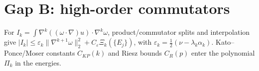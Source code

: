 \section{Gap B: high-order commutators}\label{app:gapB}
For $I_k=\int \nabla^k((\omega\cdot\nabla)u)\cdot \nabla^k\omega$, product/commutator splits and interpolation give
$|I_k|\le \varepsilon_k \|\nabla^{k+1}\omega\|_2^2 + C_\varepsilon \Xi_k(\{E_j\})$, with $\varepsilon_k=\tfrac12(\nu-\lambda_k\alpha_k)$.
Kato--Ponce/Moser constants $C_{KP}(k)$ and Riesz bounds $C_R(p)$ enter the polynomial $\Pi_k$ in the energies.
